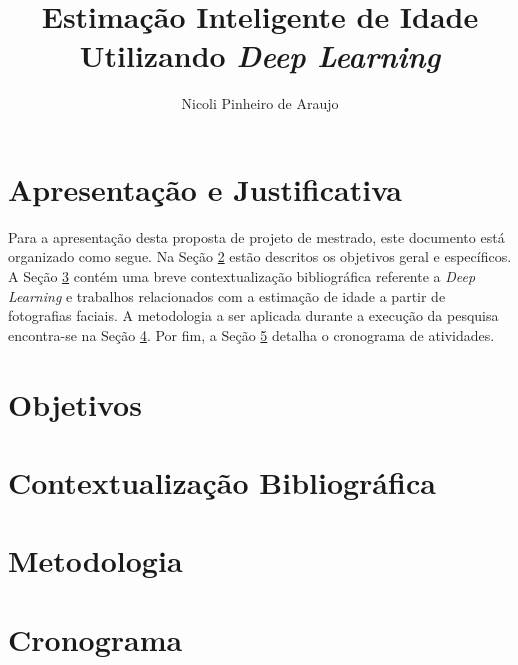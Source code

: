 \documentclass[12pt]{article}
\title{Estimação Inteligente de Idade Utilizando \emph{Deep Learning}}
\author{Nicoli Pinheiro de Araujo}
\begin{document}

\maketitle

\section{Apresentação e Justificativa}\label{sec:intro}



Para a apresentação desta proposta de projeto de mestrado, este documento está organizado como segue. Na Seção \ref{sec:objetivo} estão descritos os objetivos geral e específicos. A Seção \ref{sec:fund_teorica} contém uma breve contextualização bibliográfica referente a \emph{Deep Learning} e trabalhos relacionados com a estimação de idade a partir de fotografias faciais. A metodologia a ser aplicada durante a execução da pesquisa encontra-se na Seção \ref{sec:metodo}. Por fim, a Seção \ref{sec:crono} detalha o cronograma de atividades.

\section{Objetivos}\label{sec:objetivo}


\section{Contextualização Bibliográfica}\label{sec:fund_teorica}


\section{Metodologia}\label{sec:metodo}


\section{Cronograma}\label{sec:crono}



\end{document}

